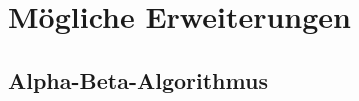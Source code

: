 
\chapter{Mögliche Erweiterungen}
\label{ch:Entwurf}

\section{Alpha-Beta-Algorithmus}
\label{ch:Entwurf:sec:1.AB-Algo}




